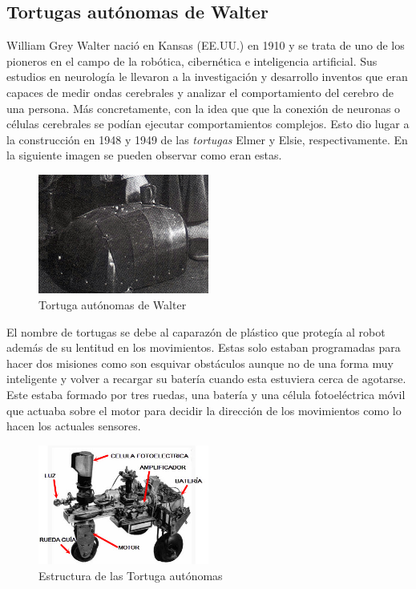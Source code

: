 \documentclass[paper=a4, fontsize=11pt]{scrartcl}
\begin{document}
\subsection{Tortugas autónomas de Walter}

William Grey Walter nació en Kansas (EE.UU.) en 1910 y se trata de uno de los pioneros en el campo de la robótica, cibernética e inteligencia artificial. Sus estudios en neurología le llevaron a la investigación y desarrollo inventos que eran capaces de medir ondas cerebrales y analizar el comportamiento del cerebro de una persona. Más concretamente, con la idea que que la conexión de neuronas o células cerebrales se podían ejecutar comportamientos complejos. Esto dio lugar a la construcción en 1948 y 1949 de las \textit{tortugas} Elmer y Elsie, respectivamente. En la siguiente imagen se pueden observar como eran estas.

\begin{figure}[H]
\begin{center}
  \includegraphics[width=0.5\textwidth]{imagenes/tortuga.jpg}
  \caption{Tortuga autónomas de Walter}
  \label{tortuga}
\end{center}
\end{figure}

El nombre de tortugas se debe al caparazón de plástico que protegía al robot además de su lentitud en los movimientos. Estas solo estaban programadas para hacer dos misiones como son esquivar obstáculos aunque no de una forma muy inteligente y volver a recargar su batería cuando esta estuviera cerca de agotarse. Este estaba formado por tres ruedas, una batería y una célula fotoeléctrica móvil que actuaba sobre el motor para decidir la dirección de los movimientos como lo hacen los actuales sensores.

\begin{figure}[H]
\begin{center}
  \includegraphics[width=0.5\textwidth]{imagenes/t1.jpg}
  \caption{Estructura de las Tortuga autónomas}
  \label{t1}
\end{center}
\end{figure}
\end{document}
